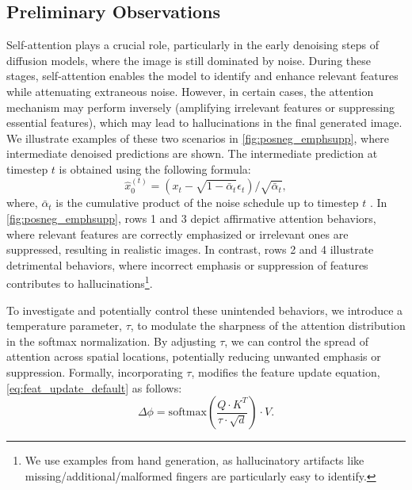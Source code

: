\subsection{Preliminary Observations}

Self-attention plays a crucial role, particularly in the early denoising steps of diffusion models, where the image is still dominated by noise.
During these stages, self-attention enables the model to identify and enhance relevant features while attenuating extraneous noise.
However, in certain cases, the attention mechanism may perform inversely (\ie amplifying irrelevant features or suppressing essential features), which may lead to hallucinations in the final generated image.
We illustrate examples of these two scenarios in \cref{fig:posneg_emphsupp}, where intermediate denoised predictions are shown. 
The intermediate prediction at timestep $t$ is obtained using the following formula:
\begin{equation}
    \hat{x}_0^{(t)} = \left ( x_t - \sqrt{1 - \bar{\alpha}_t} \epsilon_t \right ) / \sqrt{\bar{\alpha}_t},
\end{equation}
where, $\bar{\alpha}_t$ is the cumulative product of the noise schedule up to timestep $t$ \citep{ho2020ddpm}. 
In \cref{fig:posneg_emphsupp}, rows 1 and 3 depict affirmative attention behaviors, where relevant features are correctly emphasized or irrelevant ones are suppressed, resulting in realistic images.
In contrast, rows 2 and 4 illustrate detrimental behaviors, where incorrect emphasis or suppression of features contributes to hallucinations\footnote{We use examples from hand generation, as hallucinatory artifacts like missing/additional/malformed fingers are particularly easy to identify.}.

To investigate and potentially control these unintended behaviors, we introduce a temperature parameter, $\tau$, to modulate the sharpness of the attention distribution in the softmax normalization. 
By adjusting $\tau$, we can control the spread of attention across spatial locations, potentially reducing unwanted emphasis or suppression. 
Formally, incorporating $\tau$, modifies the feature update equation, \cref{eq:feat_update_default} as follows:
\begin{equation}
    \Delta \phi = \text{softmax} \left ( \frac{Q \cdot K^T}{\tau \cdot \sqrt{d}}\right) \cdot V.
\end{equation}

\vspace{-10pt}
